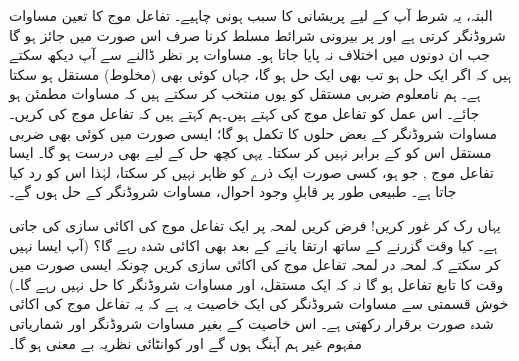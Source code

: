 البتہ، یہ شرط آپ کے لیے پریشانی کا سبب ہونی چاہیے۔ تفاعل موج کا تعین مساوات شروڈنگر کرتی ہے اور  پر بیرونی شرائط مسلط کرنا صرف اس صورت میں جائز ہو گا جب ان دونوں میں اختلاف نہ پایا جاتا ہو۔ مساوات  پر نظر ڈالنے سے آپ دیکھ سکتے ہیں کہ اگر   ایک حل ہو تب  بھی  ایک حل ہو گا، جہاں  کوئی بھی (مخلوط) مستقل ہو سکتا ہے۔  ہم نامعلوم ضربی مستقل کو یوں منتخب کر سکتے ہیں کہ مساوات  مطمئن ہو جائے۔ اس عمل کو تفاعل موج کی  کہتے ہیں۔ہم کہتے ہیں کہ تفاعل موج کی  کریں۔ مساوات شروڈنگر کے بعض حلوں کا تکمل  ہو گا؛ ایسی صورت میں کوئی بھی ضربی مستقل اس کو  کے برابر نہیں کر سکتا۔ یہی کچھ  حل  کے لیے بھی درست ہو گا۔ ایسا تفاعل موج , جو  ہو،   کسی صورت ایک ذرے کو ظاہر نہیں کر سکتا، لہٰذا اس کو رد کیا جاتا ہے۔ طبیعی طور پر  قابلِ وجود  احوال، مساوات شروڈنگر کے  حل ہوں گے۔

 یہاں رک کر غور کریں! فرض کریں لمحہ  پر ایک تفاعل موج کی اکائی سازی کی جاتی ہے۔ کیا وقت گزرنے کے ساتھ  ارتقا پانے کے بعد بھی  اکائی شدہ رہے گا؟ (آپ ایسا نہیں کر سکتے کہ لمحہ در لمحہ تفاعل موج کی اکائی سازی کریں چونکہ ایسی صورت میں  وقت  کا تابع تفاعل ہو گا نہ کہ ایک مستقل، اور  مساوات شروڈنگر کا حل نہیں رہے گا۔) خوش قسمتی سے مساوات شروڈنگر کی  ایک  خاصیت  یہ ہے کہ یہ تفاعل موج کی اکائی شدہ صورت برقرار رکھتی ہے۔ اس خاصیت کے بغیر مساوات شروڈنگر اور شماریاتی مفہوم غیر ہم آہنگ ہوں گے اور کوانٹائی نظریہ بے معنی ہو گا۔

